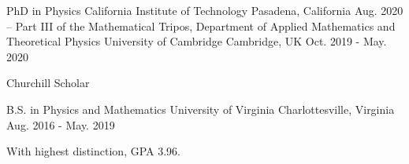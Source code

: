 

\begin{cventries}

  \cventry
    { PhD in Physics} %
    {California Institute of Technology} %
    {Pasadena, California} %
    {Aug. 2020 --} %
    {
    }
  \cventry
    { Part III of the Mathematical Tripos, Department of Applied Mathematics and Theoretical Physics} %
    {University of Cambridge} %
    {Cambridge, UK} %
    {Oct. 2019 - May. 2020} %
    {
      \begin{cvitems} %
        \item {Churchill Scholar\\}
      \end{cvitems}
    }
  \cventry
    {B.S. in Physics and Mathematics} %
    {University of Virginia} %
    {Charlottesville, Virginia} %
    {Aug. 2016 - May. 2019} %
    {
      \begin{cvitems} %
        \item {With highest distinction, GPA 3.96.}
      \end{cvitems}
    }

\end{cventries}
